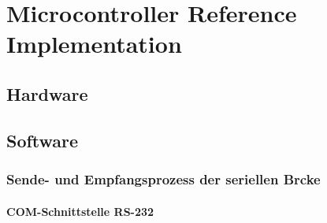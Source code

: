 \documentclass[a4paper]{book}%
\begin{document}
\chapter{Microcontroller Reference Implementation}

\section{Hardware}
\section{Software}

\subsection{Sende- und Empfangsprozess der seriellen Brcke}

\subsubsection{COM-Schnittstelle RS-232}
\end{document}
